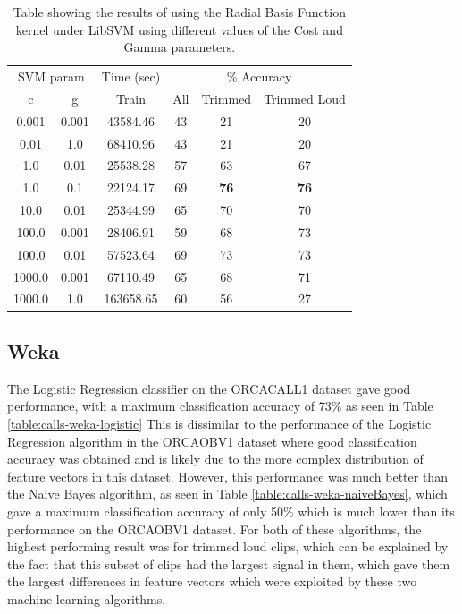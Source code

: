 \documentclass[12pt,oneside]{book}
\begin{document}
%
%
\begin{table}
\begin{tabular}{|c|c|c|c|c|c|}
\hline
\multicolumn{2}{|c|}{SVM param} & \multicolumn{1}{c|}{Time (sec)} & \multicolumn{3}{c|}{\% Accuracy} \\
\hhline{|-|-|-|-|-|-|}
c & g & Train & All & Trimmed & Trimmed Loud \\
\hhline{|=|=|=|=|=|=|}
0.001  & 0.001   &    43584.46   &  43  & 21 & 20 \\
0.01   & 1.0     &    68410.96   &  43  & 21 & 20 \\
1.0    & 0.01    &    25538.28   &  57  & 63 & 67 \\
1.0    & 0.1     &    22124.17   &  69  & \textbf{76} & \textbf{76} \\
10.0   & 0.01    &    25344.99   &  65  & 70 & 70 \\
100.0  & 0.001   &    28406.91   &  59  & 68 & 73 \\
100.0  & 0.01    &    57523.64   &  69  & 73 & 73 \\
1000.0 & 0.001   &    67110.49   &  65  & 68 & 71 \\
1000.0 & 1.0     &   163658.65   &  60  & 56 & 27 \\
\hline
\end{tabular}
\caption{Table showing the results of using the Radial Basis Function
  kernel under LibSVM using different values of the Cost and Gamma
  parameters.}
\label{table:calls-libsvm-rbf}
\end{table}

%
%
\subsection{Weka}

The Logistic Regression classifier on the ORCACALL1 dataset gave good
performance, with a maximum classification accuracy of 73\% as seen in
Table \ref{table:calls-weka-logistic} This is dissimilar to the
performance of the Logistic Regression algorithm in the ORCAOBV1
dataset where good classification accuracy was obtained and is likely
due to the more complex distribution of feature vectors in this
dataset.  However, this performance was much better than the Naive
Bayes algorithm, as seen in Table \ref{table:calls-weka-naiveBayes},
which gave a maximum classification accuracy of only 50\% which is
much lower than its performance on the ORCAOBV1 dataset.  For both of
these algorithms, the highest performing result was for trimmed loud
clips, which can be explained by the fact that this subset of clips
had the largest signal in them, which gave them the largest
differences in feature vectors which were exploited by these two
machine learning algorithms.
\end{document}
